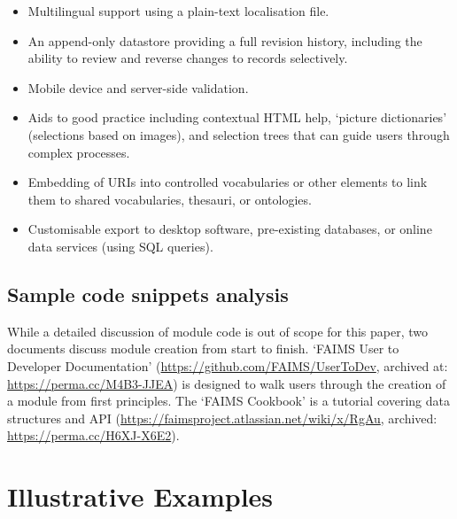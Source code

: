 \documentclass[preprint,12pt, a4paper]{elsarticle}
\begin{document}
\begin{itemize}
\item Multilingual support using a plain-text localisation file.
\item An append-only datastore providing a full revision history, including the ability to review and reverse changes to records selectively.
\item Mobile device and server-side validation.
\item Aids to good practice including contextual HTML help, `picture dictionaries' (selections based on images), and selection trees that can guide users through complex processes.
\item Embedding of URIs into controlled vocabularies or other elements to link them to shared vocabularies, thesauri, or ontologies.
\item Customisable export to desktop software, pre-existing databases, or online data services (using SQL queries).
\end{itemize}


\subsection{Sample code snippets analysis}


While a detailed discussion of module code is out of scope for this paper, two documents discuss module creation from start to finish. `FAIMS User to Developer Documentation' (\url{https://github.com/FAIMS/UserToDev}, archived at: \url{https://perma.cc/M4B3-JJEA}) is designed to walk users through the creation of a module from first principles. The `FAIMS Cookbook' is a tutorial covering data structures and API (\url{https://faimsproject.atlassian.net/wiki/x/RgAu}, archived: \url{https://perma.cc/H6XJ-X6E2}).

\section{Illustrative Examples}
\end{document}
